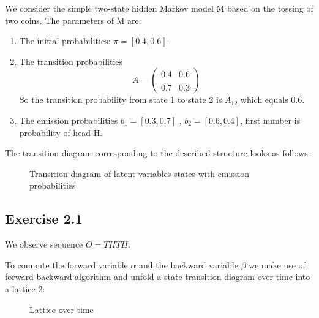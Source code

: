 \documentclass[11pt,a4paper]{article}
\begin{document}
	We consider the simple two-state hidden Markov model M based on the tossing of two coins. The parameters
	of M are:
	\begin{enumerate}
		\item The initial probabilities: $\pi = [0.4, 0.6]$.
		\item The transition probabilities 
		$$ A = \left(\begin{smallmatrix} 0.4 & 0.6 \\ \\ 0.7 & 0.3 \end{smallmatrix} \right)  $$
		So the transition probability from state 1 to state 2 is $ A_{12} $ which equals 0.6.
		\item The emission probabilities $b_1 = [0.3, 0.7]$ , $b_2 = [0.6, 0.4]$, first number is probability of head H.
	\end{enumerate}
	
	
	The transition diagram corresponding to the described structure looks as follows:
	\begin{figure}[H]
		\caption{Transition diagram of latent variables states with emission probabilities}
		\label{fig:diagram}
	\end{figure}
	
	\subsection*{Exercise 2.1}
	
	We observe sequence $ O=THTH$.
	
	To compute the forward variable $\alpha$ and the backward variable $\beta$ we make use of forward-backward algorithm and unfold a state transition diagram over time into a lattice \ref{fig:lattice}:
	
	\begin{figure}[H]
		\caption{Lattice over time}
		\label{fig:lattice}
	\end{figure}
	
\end{document}
